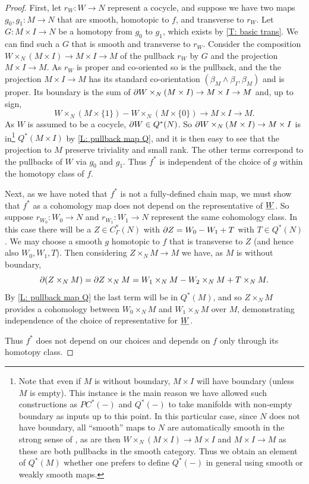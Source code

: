 \begin{proof}
First, let $r_W \colon W \to N$ represent a cocycle, and suppose we have two maps $g_0, g_1 \colon M \to N$ that are smooth, homotopic to $f$, and transverse to $r_W$.
Let $G \colon M \times I \to N$ be a homotopy from $g_0$ to $g_1$, which exists by \cref{T: basic trans}. We can find such a $G$ that is smooth and transverse to $r_W$. Consider the composition $W\times_N (M \times I) \to M \times I \to M$ of the pullback $r_W$ by $G$ and the projection $M \times I \to M$. As $r_W$ is proper and co-oriented so is the pullback, and the the projection $M \times I \to M$ has its standard co-orientation $(\beta_M \wedge \beta_I,\beta_M)$ and is proper. Its boundary is the sum of $\partial W\times_N (M \times I) \to M \times I \to M$ and, up to sign, $$W\times_N (M \times \{1\}) - W\times_N(M \times \{0\}) \to M \times I \to M.$$ As $W$ is assumed to be a cocycle, $\partial W \in Q^*(N)$. So $\partial W\times_N (M \times I) \to M \times I$ is in\footnote{Note that even if $M$ is without boundary, $M \times I$ will have boundary (unless $M$ is empty). This instance is the main reason we have allowed such constructions as $PC^*(-)$ and $Q^*(-)$ to take manifolds with non-empty boundary as inputs up to this point. In this particular case, since $N$ does not have boundary, all ``smooth'' maps to $N$ are automatically smooth in the strong sense of \cite{Joy12}, as are then $W\times_N (M \times I) \to M \times I$ and $M \times I \to M$ as these are both pullbacks in the smooth category. Thus we obtain an element of $Q^*(M)$ whether one prefers to define $Q^*(-)$ in general using smooth or weakly smooth maps.} $Q^*(M \times I)$ by \cref{L: pullback map Q}, and it is then easy to see that the projection to $M$ preserve triviality and small rank. The other terms correspond to the pullbacks of $W$ via $g_0$ and $g_1$. Thus $f^*$ is independent of the choice of $g$ within the homotopy class of $f$.

Next, as we have noted that $f^*$ is not a fully-defined chain map, we must show that $f^*$ as a cohomology map does not depend on the representative of $\underline{W}$. So suppose $r_{W_0} \colon W_0 \to N$ and $r_{W_1} \colon W_1 \to N$ represent the same cohomology class. In this case there will be a $Z \in C^*_\Gamma(N)$ with $\partial Z = W_0-W_1+T$ with $T \in Q^*(N)$. We may choose a smooth $g$ homotopic to $f$ that is transverse to $Z$ (and hence also $W_0,W_1, T$). Then considering $Z\times_N M \to M$ we have, as $M$ is without boundary,
$$\partial(Z\times_N M) = \partial Z\times_N M = W_1\times_N M -W_2\times_N M+T\times_N M.$$
By \cref{L: pullback map Q} the last term will be in $Q^*(M)$, and so $Z\times_NM$ provides a cohomology between $W_0\times_NM$ and $W_1\times_NM$ over $M$, demonstrating independence of the choice of representative for $\underline{W}$.

Thus $f^*$ does not depend on our choices and depends on $f$ only through its homotopy class.
\end{proof}

